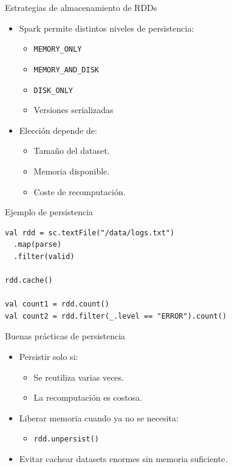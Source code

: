 \documentclass{beamer}
\begin{document}
\begin{frame}{Estrategias de almacenamiento de RDDs}
\begin{itemize}
  \item Spark permite distintos niveles de persistencia:
  \begin{itemize}
    \item \texttt{MEMORY\_ONLY}
    \item \texttt{MEMORY\_AND\_DISK}
    \item \texttt{DISK\_ONLY}
    \item Versiones serializadas
  \end{itemize}
  \item Elección depende de:
  \begin{itemize}
    \item Tamaño del dataset.
    \item Memoria disponible.
    \item Coste de recomputación.
  \end{itemize}
\end{itemize}
\end{frame}

\begin{frame}[fragile]{Ejemplo de persistencia}
\begin{verbatim}
val rdd = sc.textFile("/data/logs.txt")
  .map(parse)
  .filter(valid)

rdd.cache()

val count1 = rdd.count()
val count2 = rdd.filter(_.level == "ERROR").count()
\end{verbatim}
\end{frame}

\begin{frame}{Buenas prácticas de persistencia}
\begin{itemize}
  \item Persistir solo si:
  \begin{itemize}
    \item Se reutiliza varias veces.
    \item La recomputación es costosa.
  \end{itemize}
  \item Liberar memoria cuando ya no se necesita:
  \begin{itemize}
    \item \texttt{rdd.unpersist()}
  \end{itemize}
  \item Evitar cachear datasets enormes sin memoria suficiente.
\end{itemize}
\end{frame}
\end{document}
